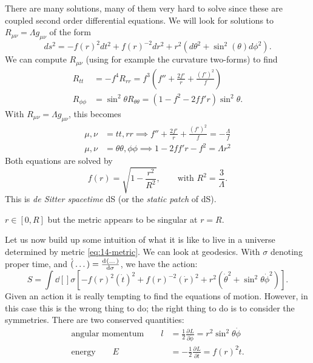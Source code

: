 There are many solutions, many of them very hard to solve since these are coupled second order differential equations. We will look for solutions to $R_{\mu\nu} = \Lambda g_{\mu\nu}$ of the form
\begin{equation}
  \label{eq:14-metric}
  ds^2 = -f(r)^2 dt^2 + f(r)^{-2} dr^2 + r^2 (d\theta^2 + \sin^2(\theta) d\phi^2).
\end{equation}
We can compute $R_{\mu\nu}$ (using for example the curvature two-forms) to find 
\begin{align}
  R_{t t } &= -f^4 R_{rr} = f^3 (f'' + \frac{2f'}{r} + \frac{(f')^2}{f}) \\
  R_{\phi\phi} &= \sin^2\theta R_{\theta\theta} = (1 - f^2 - 2 ff' r) \sin^2\theta.
\end{align}
With $R_{\mu\nu} = \Lambda g_{\mu\nu}$, this becomes
\begin{align}
  \mu,\nu &= t t, r r \implies f'' + \frac{2 f'}{r} + \frac{(f')^2}{f} = -\frac{\Lambda}{f}   \\
  \mu, \nu &= \theta\theta, \phi\phi \implies 1 - 2 ff' r - f^2 = \Lambda r^2
\end{align}
Both equations are solved by
\begin{equation}
  f(r) = \sqrt{1 - \frac{r^2}{R^2}}, \qquad \text{with } R^2 = \frac{3}{\Lambda}.
\end{equation}
This is \emph{de Sitter spacetime} dS (or the \emph{static patch} of dS).
\begin{leftbar}
  \begin{remark}
    $r\in [0, R]$ but the metric appears to be singular at $r = R$.
  \end{remark}
\end{leftbar}
Let us now build up some intuition of what it is like to live in a universe determined by metric \eqref{eq:14-metric}.
We can look at geodesics. With $\sigma$ denoting proper time, and $\dot(\dots) = \dv[]{(\dots)}{\sigma}$, we have the action:
\begin{equation}
  S = \int \dd[]{\sigma} \left[ -f(r)^2 (\dot t)^2 + f(r)^{-2} (\dot r)^2 + r^2 (\dot \theta^2 + \sin^2 \theta \dot \phi^2) \right].
\end{equation}
Given an action it is really tempting to find the equations of motion. However, in this case this is the wrong thing to do; the right thing to do is to consider the symmetries.
There are two conserved quantities: 
\begin{align}
  \text{angular momentum} \qquad l &= \frac{1}{2} \frac{\partial^{} L}{\partial \dot \phi} = r^2 \sin^2\theta \dot \phi \\
  \text{energy} \qquad E &= -\frac{1}{2} \frac{\partial^{} L}{\partial \dot t} = f(r)^2 \dot t.
\end{align}
